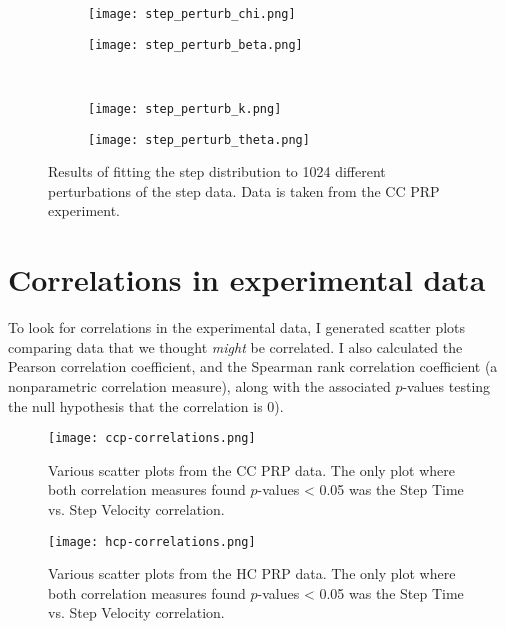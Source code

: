 \documentclass{article}
\begin{document}
\begin{figure}
  \centering
  \begin{subfigure}{0.48\textwidth}
    \texttt{[image: step\_perturb\_chi.png]}
  \end{subfigure}
  \hfill
  \begin{subfigure}{0.48\textwidth}
    \texttt{[image: step\_perturb\_beta.png]}
  \end{subfigure}
  \\
  \begin{subfigure}{0.48\textwidth}
    \texttt{[image: step\_perturb\_k.png]}
  \end{subfigure}
  \hfill
  \begin{subfigure}{0.48\textwidth}
    \texttt{[image: step\_perturb\_theta.png]}
  \end{subfigure}
  \caption{Results of fitting the step distribution to 1024 different
    perturbations of the step data. Data is taken from the CC PRP
    experiment.}
  \label{fig:step_perturb}
\end{figure}

\section{Correlations in experimental data}
\label{sec:corr-exper-data}

To look for correlations in the experimental data, I generated scatter
plots comparing data that we thought \emph{might} be correlated. I
also calculated the Pearson correlation coefficient, and the Spearman
rank correlation coefficient (a nonparametric correlation measure),
along with the associated $p$-values testing the null hypothesis that
the correlation is 0). 

\begin{figure}
  \centering
  \texttt{[image: ccp-correlations.png]}
  \caption{Various scatter plots from the CC PRP data. The only plot
    where both correlation measures found $p$-values < 0.05 was the
    Step Time vs. Step Velocity correlation.}
  \label{fig:ccp-correlations}
\end{figure}

\begin{figure}
  \centering
  \texttt{[image: hcp-correlations.png]}
  \caption{Various scatter plots from the HC PRP data. The only plot
    where both correlation measures found $p$-values < 0.05 was the
    Step Time vs. Step Velocity correlation.}
  \label{fig:hcp-correlations}
\end{figure}
\end{document}
